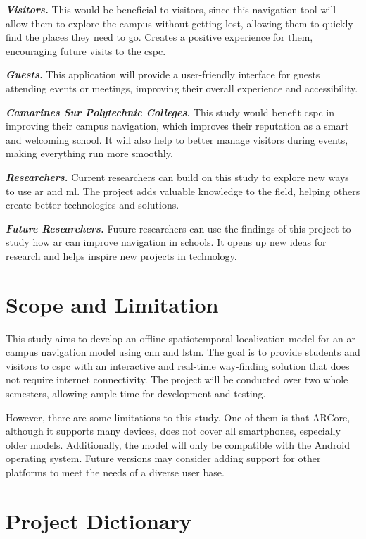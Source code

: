 \begin{refsection}
\textit{\textbf{Visitors.}} This would be beneficial to visitors, since this navigation tool will allow them to explore the campus without getting lost, allowing them to quickly find the places they need to go. Creates a positive experience for them, encouraging future visits to the \gls{cspc}.

\textit{\textbf{Guests.}} This application will provide a user-friendly interface for guests attending events or meetings, improving their overall experience and accessibility.

\textit{\textbf{Camarines Sur Polytechnic Colleges.}} This study would benefit \gls{cspc} in improving their campus navigation, which improves their reputation as a smart and welcoming school. It will also help to better manage visitors during events, making everything run more smoothly.

\textit{\textbf{Researchers.}} Current researchers can build on this study to explore new ways to use \gls{ar} and \gls{ml}. The project adds valuable knowledge to the field, helping others create better technologies and solutions.

\textit{\textbf{Future Researchers.}} Future researchers can use the findings of this project to study how \gls{ar} can improve navigation in schools. It opens up new ideas for research and helps inspire new projects in technology.

\section{Scope and Limitation}

This study aims to develop an offline spatiotemporal localization model for an \gls{ar} campus navigation model using \gls{cnn} and \gls{lstm}. The goal is to provide students and visitors to \gls{cspc} with an interactive and real-time way-finding solution that does not require internet connectivity. The project will be conducted over two whole semesters, allowing ample time for development and testing.

However, there are some limitations to this study. One of them is that ARCore, although it supports many devices, does not cover all smartphones, especially older models. Additionally, the model will only be compatible with the Android operating system. Future versions may consider adding support for other platforms to meet the needs of a diverse user base.

\section{Project Dictionary}


\end{refsection}
